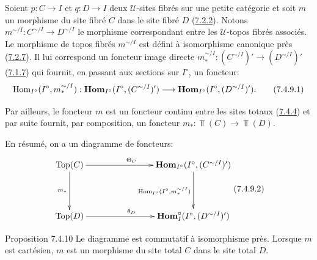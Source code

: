 \documentclass[10pt]{../fichiers-configuration-latex/smfart}
\begin{document}
\subsubsection{}

Soient $p : C \to I$ et $q : D \to I$ deux $𝒰$-sites fibrés sur une
petite catégorie et soit $m$ un morphisme du site fibré $C$ dans le
site fibré $D$ (\hyperref[VI.subsubsec7.2.2]{7.2.2}). Notons $m^{\sim/I} : C^{\sim/I} \to
D^{\sim/I}$ le morphisme correspondant entre les $𝒰$-topos fibrés
associés. Le morphisme de topos fibrés $m^{\sim/I}$ est défini à
isomorphisme canonique près (\hyperref[VI.prop7.2.7]{7.2.7}). Il lui correspond un foncteur
image directe $m^{\sim/I}_{\ast} : (C^{\sim /I})'\to (D^{\sim/I})'$ (\hyperref[VI.subsubsec7.1.7]{7.1.7})
qui fournit, en passant aux sections sur $I^{\circ}$, un foncteur:
\begin{equation*}
\Hom_{I^{\circ}} (I^{\circ}, m^{\sim/I}_{\ast}) : \Hhom_{I^{\circ}}
(I^{\circ}, (C^{\sim/I})') \to \Hhom_{I^{\circ}} (I^{\circ},
(D^{\sim/I})'){\quoi}.\tag{7.4.9.1}
\end{equation*}

Par ailleurs, le foncteur $m$ est un foncteur continu entre les
sites totaux (\hyperref[VI.prop7.4.4]{7.4.4}) et par suite fournit, par
composition, un foncteur $m_{\ast} : \Top(C) \to \Top(D)$.

En résumé, on a un diagramme de foncteurs:
\[\vcenter{
\xymatrix@C=2.75cm@R=1.5cm{
\Top(C) \ar[r]^{\Theta_C} \ar[d]_{m_{\ast}}& \Hhom_{I^{\circ}}(I^{\circ},(C^{\sim/I})') \ar[d]_{\Hom_{I^\circ}(I^{\circ},m_{\ast}^{\sim/I})}\\
\Top(D)  \ar[r]^{\theta_D} & \Hhom_I^{\circ}(I^{\circ},(D^{\sim/I})')
}}\leqno{(7.4.9.2)}
\]

\begin{enonce*}{Proposition 7.4.10}
Le diagramme\pageoriginale {} est commutatif à isomorphisme
près. Lorsque $m$
est cartésien, $m$ est un morphisme du site total $C$ dans le site
total $D$.
\end{enonce*}
\end{document}
